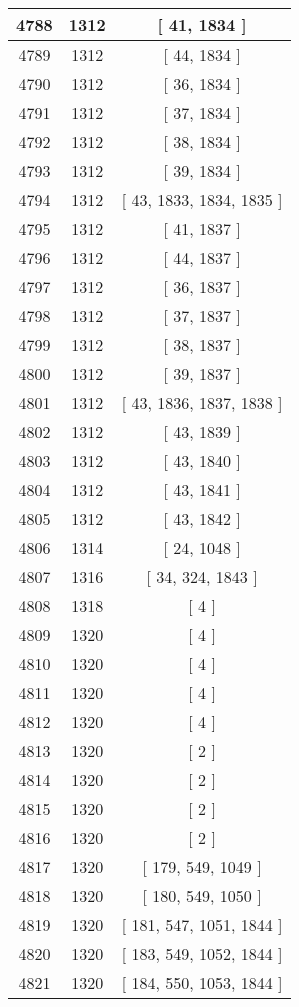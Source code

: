 \begin{center}
\begin{longtable}[H]{|| c c c ||}
\hline
4788 & 1312 & [ 41, 1834 ] \\ 
\hline
4789 & 1312 & [ 44, 1834 ] \\ 
\hline
4790 & 1312 & [ 36, 1834 ] \\ 
\hline
4791 & 1312 & [ 37, 1834 ] \\ 
\hline
4792 & 1312 & [ 38, 1834 ] \\ 
\hline
4793 & 1312 & [ 39, 1834 ] \\ 
\hline
4794 & 1312 & [ 43, 1833, 1834, 1835 ] \\ 
\hline
4795 & 1312 & [ 41, 1837 ] \\ 
\hline
4796 & 1312 & [ 44, 1837 ] \\ 
\hline
4797 & 1312 & [ 36, 1837 ] \\ 
\hline
4798 & 1312 & [ 37, 1837 ] \\ 
\hline
4799 & 1312 & [ 38, 1837 ] \\ 
\hline
4800 & 1312 & [ 39, 1837 ] \\ 
\hline
4801 & 1312 & [ 43, 1836, 1837, 1838 ] \\ 
\hline
4802 & 1312 & [ 43, 1839 ] \\ 
\hline
4803 & 1312 & [ 43, 1840 ] \\ 
\hline
4804 & 1312 & [ 43, 1841 ] \\ 
\hline
4805 & 1312 & [ 43, 1842 ] \\ 
\hline
4806 & 1314 & [ 24, 1048 ] \\ 
\hline
4807 & 1316 & [ 34, 324, 1843 ] \\ 
\hline
4808 & 1318 & [ 4 ] \\ 
\hline
4809 & 1320 & [ 4 ] \\ 
\hline
4810 & 1320 & [ 4 ] \\ 
\hline
4811 & 1320 & [ 4 ] \\ 
\hline
4812 & 1320 & [ 4 ] \\ 
\hline
4813 & 1320 & [ 2 ] \\ 
\hline
4814 & 1320 & [ 2 ] \\ 
\hline
4815 & 1320 & [ 2 ] \\ 
\hline
4816 & 1320 & [ 2 ] \\ 
\hline
4817 & 1320 & [ 179, 549, 1049 ] \\ 
\hline
4818 & 1320 & [ 180, 549, 1050 ] \\ 
\hline
4819 & 1320 & [ 181, 547, 1051, 1844 ] \\ 
\hline
4820 & 1320 & [ 183, 549, 1052, 1844 ] \\ 
\hline
4821 & 1320 & [ 184, 550, 1053, 1844 ] \\ 

\end{longtable}
\end{center}
